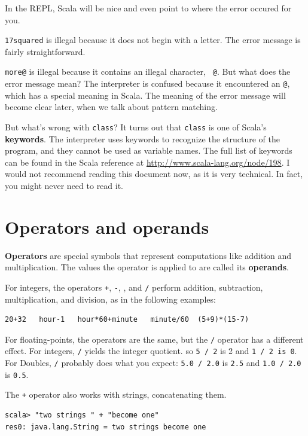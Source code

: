 \documentclass[10pt]{book}
\begin{document}
In the REPL, Scala will be nice and even point to where the error occured for you.

{\tt 17squared} is illegal because it does not begin with a letter. The error message is fairly straightforward.

{\tt more@} is illegal because it contains an illegal character, {\tt
@}.  But what does the error message mean? The interpreter is confused because it encountered an {\tt @}, which has a special meaning in Scala. The meaning of the error message will become clear later, when we talk about pattern matching.

But what's wrong with {\tt class}?
It turns out that {\tt class} is one of Scala's {\bf keywords}.  The
interpreter uses keywords to recognize the structure of the program,
and they cannot be used as variable names. The full list of keywords 
can be found in the Scala reference at
\url{http://www.scala-lang.org/node/198}. I would not recommend reading this document now, as it is
 very technical. In fact, you might never need to read it.


\section{Operators and operands}

{\bf Operators} are special symbols that represent computations like
addition and multiplication.  The values the operator is applied to
are called its {\bf operands}.


For integers, the operators {\tt +}, {\tt -}, {\tt *}, and {\tt /}
perform addition, subtraction, multiplication, and division, as in 
the following examples:

\beforeverb
\begin{verbatim}
20+32   hour-1   hour*60+minute   minute/60  (5+9)*(15-7)
\end{verbatim}
\afterverb

For floating-points, the operators are the same, but the {\tt /} operator has a different effect.
 For integers, {\tt /} yields the integer quotient. so {\tt 5 / 2} is 2 and {\tt 1 / 2 is 0}.
 For Doubles, {\tt /} probably does what you expect: {\tt 5.0 / 2.0} is {\tt 2.5} and
 {\tt 1.0 / 2.0} is {\tt 0.5}.

The {\tt +} operator also works with strings, concatenating them.
\beforeverb
\begin{verbatim}
scala> "two strings " + "become one"
res0: java.lang.String = two strings become one
\end{verbatim}
\afterverb
\end{document}
